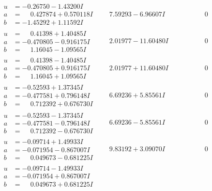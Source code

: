 \documentclass[1p]{elsarticle_modified}
\theoremstyle{definition}
\begin{document}
$$\begin{array}{c|c|c}
\begin{aligned}
u &= -0.26750 - 1.43200 I \\
a &= \phantom{-}0.427874 + 0.570118 I \\
b &= -1.45292 + 1.11592 I\end{aligned}
 & \phantom{-}7.59293 - 6.96607 I & \phantom{-0.000000 } 0 \\ \hline\begin{aligned}
u &= \phantom{-}0.41398 + 1.40485 I \\
a &= -0.470805 - 0.916175 I \\
b &= \phantom{-}1.16045 - 1.09565 I\end{aligned}
 & \phantom{-}2.01977 - 11.60480 I & \phantom{-0.000000 } 0 \\ \hline\begin{aligned}
u &= \phantom{-}0.41398 - 1.40485 I \\
a &= -0.470805 + 0.916175 I \\
b &= \phantom{-}1.16045 + 1.09565 I\end{aligned}
 & \phantom{-}2.01977 + 11.60480 I & \phantom{-0.000000 } 0 \\ \hline\begin{aligned}
u &= -0.52593 + 1.37345 I \\
a &= -0.477581 + 0.796148 I \\
b &= \phantom{-}0.712392 + 0.676730 I\end{aligned}
 & \phantom{-}6.69236 + 5.85561 I & \phantom{-0.000000 } 0 \\ \hline\begin{aligned}
u &= -0.52593 - 1.37345 I \\
a &= -0.477581 - 0.796148 I \\
b &= \phantom{-}0.712392 - 0.676730 I\end{aligned}
 & \phantom{-}6.69236 - 5.85561 I & \phantom{-0.000000 } 0 \\ \hline\begin{aligned}
u &= -0.09714 + 1.49933 I \\
a &= -0.071954 - 0.867007 I \\
b &= \phantom{-}0.049673 - 0.681225 I\end{aligned}
 & \phantom{-}9.83192 + 3.09070 I & \phantom{-0.000000 } 0 \\ \hline\begin{aligned}
u &= -0.09714 - 1.49933 I \\
a &= -0.071954 + 0.867007 I \\
b &= \phantom{-}0.049673 + 0.681225 I\end{aligned}

\end{array}$$
\end{document}
